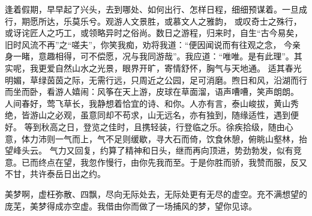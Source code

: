 \begin{adjustwidth}{0cm}{0cm}
{        \hspace*{2em} 逢着假期，早早起了兴头，去到哪处、如何出行、怎样日程，细细预谋着。一旦成行，期愿所达，乐莫乐兮。观游人文景胜，或慕文人之雅韵，
        或叹奇士之殊行，或讶诧匠人之巧工，或领略异时之俗尚。数日之游程，归来时，自生“古今易矣，旧时风流不再”之“嗟夫”，你笑我痴，劝将我道：“便因闻说而有往观之念，
        今亲身一睹，意趣相得，可不偿愿，况与我同游哉”。我应道：“唯唯。是有此理”。其实呢，我更爱自然山水之光景，眼界开旷，寄情舒怀，胸气与天地通。
        适其春光明媚，草绿茵茵之际，无需行远，只周近之公园，足可消磨。煦日和风，沿湖而行而坐而卧，看游人嬉闹：风筝在天上游，皮球在草面溜，语声嘈嘈，笑声朗朗。
        人间春好，莺飞草长，我静想着恰宜的诗、和你。人亦有言，泰山峻拔，黄山秀绝，皆游山之必观，虽意同却不苟求，山无远名，亦有独到，随缘适性，遇到便好。
        等到秋高之日，登览之佳时，且携轻装，行登临之乐。徐疾拾级，随由心意，体力沛则一气而上，气不足则缓歇，寻大石而倚，饮食休憩，俯眺山壑林，抬望峰头云。
        气力又回复，约算了精神和日头，继而再向顶进，势劲勃发，似有竞意。已而终点在望，我忽作慢行，由你先我而至。于是你胜而骄，我赞而服，反又不甘，共许泰岳日出之约。

        \hspace*{2em} 美梦啊，虚枉弥散、四飘，尽向无际处去，无际处更有无尽的虚空。充不满想望的庞芜，美梦得成亦空虚。我借由你而做了一场捕风的梦，望你见谅。
    }
\end{adjustwidth}
\newpage